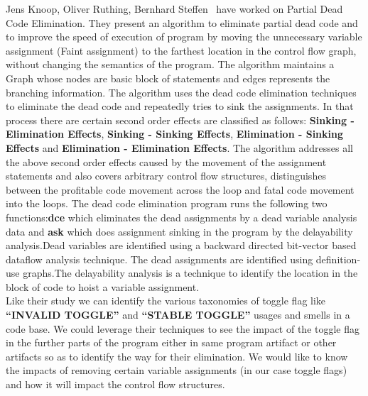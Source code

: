 \documentclass[conference]{IEEEtran}
\begin{document}
Jens Knoop, Oliver Ruthing, Bernhard Steffen~\cite{knoop1994partial} have worked on Partial Dead Code Elimination. They present an algorithm to eliminate partial dead code and to improve the speed of execution of program by moving the unnecessary variable assignment (Faint assignment) to the farthest location in the control flow graph, without changing the semantics of the program. The algorithm maintains a Graph whose nodes are basic block of statements and edges represents the branching information. The algorithm uses the dead code elimination techniques to eliminate the dead code and repeatedly tries to sink the assignments. In that process there are certain second order effects are classified as follows:
\textbf{Sinking - Elimination Effects},
\textbf{Sinking - Sinking Effects},
\textbf{Elimination - Sinking Effects} and \textbf{Elimination - Elimination Effects}. The algorithm addresses all the above second order effects caused by the movement of the assignment statements and also covers arbitrary control flow structures, distinguishes between the profitable code movement across the loop and fatal code movement into the loops. The dead code elimination program runs the following two functions:\textbf{dce} which eliminates the dead assignments by a dead variable analysis data and \textbf{ask} which does assignment sinking in the program by the delayability analysis.Dead variables are identified using a backward directed bit-vector based dataflow analysis technique. The dead assignments are identified using definition-use graphs.The delayability analysis is a technique to identify the location in the block of code to hoist a variable assignment.\\

Like their study we can identify the various taxonomies of toggle flag like \textbf{“INVALID TOGGLE”} and \textbf{“STABLE TOGGLE”} usages and smells  in a code base. We could leverage their techniques to see the impact of the toggle flag in the further parts of the program either in same program artifact or other artifacts so as to identify the way for their elimination. We would like to know the impacts of removing certain variable assignments (in our case toggle flags) and how it will impact the control flow structures.\\
\end{document}
